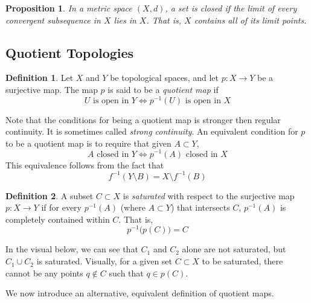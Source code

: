 \documentclass{article}
\newtheorem{proposition}[theorem]{Proposition}
\theoremstyle{remark}
\theoremstyle{definition}
\newtheorem{definition}{Definition}[section]
\begin{document}
\begin{proposition}
In a metric space $(X, d)$, a set is \textit{closed} if the limit of every convergent subsequence in $X$ lies in $X$. That is, $X$ contains all of its limit points. 
\end{proposition}

\subsection{Quotient Topologies}
\begin{definition}
Let $X$ and $Y$ be topological spaces, and let $p: X \longrightarrow Y$ be a surjective map. The map $p$ is said to be a \textit{quotient map} if
\[U \text{ is open in } Y \iff p^{-1}(U) \text{ is open in } X\]
\end{definition}

Note that the conditions for being a quotient map is stronger then regular continuity. It is sometimes called \textit{strong continuity}. An equivalent condition for $p$ to be a quotient map is to require that given $A \subset Y$, 
\[A \text{ closed in } Y \iff p^{-1}(A) \text{ closed in } X\]
This equivalence follows from the fact that
\[f^{-1}(Y \setminus B) = X \setminus f^{-1}(B)\]

\begin{definition}
A subset $C \subset X$ is \textit{saturated} with respect to the surjective map $p: X \longrightarrow Y$ if for every $p^{-1} (A)$ (where $A \subset Y$) that intersects $C$, $p^{-1}(A)$ is completely contained within $C$. That is, 
\[p^{-1} \big( p(C) \big) = C\]
\end{definition}

In the visual below, we can see that $C_1$ and $C_2$ alone are not saturated, but $C_1 \cup C_2$ is saturated. Visually, for a given set $C \subset X$ to be saturated, there cannot be any points $q \not\in C$ such that $q \in p(C)$. 

\begin{center}
\end{center}
We now introduce an alternative, equivalent definition of quotient maps. 
\end{document}
